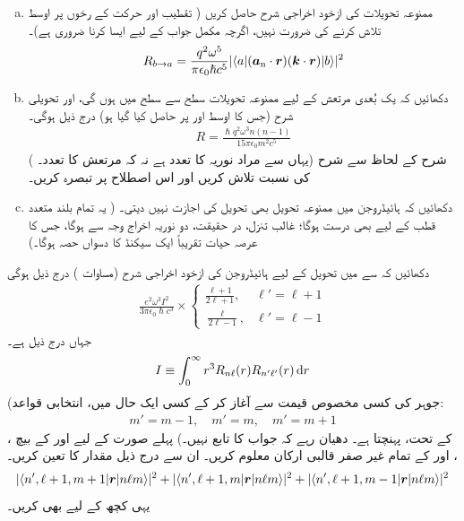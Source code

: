 \begin{enumerate}[a.]
\item
ممنوعہ تحویلات کی ازخود اخراجی شرح حاصل کریں ( تقطیب اور حرکت کے رخوں پر اوسط تلاش کرنے کی ضرورت نہیں، اگرچہ مکمل جواب کے لیے ایسا کرنا ضروری ہے)۔ 
\begin{align}
	R_{b\to a} = \frac{q^2\omega^5}{\pi\epsilon_0\hslash c^5}|\langle a|({{\boldsymbol{a}}_{\textup{n}}}\cdot{\ensuremath{{\boldsymbol{r}}}})({\boldsymbol{k}}\cdot {\ensuremath{{\boldsymbol{r}}}})|b \rangle|^2
\end{align}
\item
 دکھائیں کہ یک بُعدی مرتعش کے لیے ممنوعہ تحویلات سطح  سے سطح  میں ہوں گی، اور تحویلی شرح (جس کا اوسط  اور  پر حاصل کیا گیا ہو) درج ذیل ہوگی۔
\begin{align}
	R = \frac{\hslash q^2\omega^3n(n-1)}{15\pi\epsilon_0m^2c^5}
\end{align}
( یہاں  سے مراد نوریہ کا تعدد ہے نہ کہ مرتعش کا تعدد۔) شرح کے لحاظ سے  شرح کی نسبت تلاش کریں اور اس اصطلاح پر تبصرہ کریں۔
\item
 دکھائیں کہ ہائیڈروجن میں ممنوعہ تحویل بھی  تحویل کی اجازت نہیں دیتی۔ ( یہ تمام بلند متعدد قطب کے لیے بھی درست ہوگا؛ غالب تنزل، در حقیقت، دو نوریہ اخراج وجہ سے ہوگا، جس کا عرصہ حیات تقریباً ایک سیکنڈ کا دسواں حصہ ہوگا۔)
 \end{enumerate}
دکھائیں کہ  سے  میں تحویل کے لیے ہائیڈروجن کی ازخود اخراجی شرح (مساوات ) درج ذیل ہوگی
\begin{align}
	\frac{e^2\omega^3I^2}{3\pi\epsilon_0\hslash c^3}\times
	\begin{cases}
		\frac{\ell +1}{2\ell +1}, & \ell '= \ell +1 \\
		\frac{\ell }{2\ell -1}, & \ell '= \ell -1 
	\end{cases}
\end{align}
جہاں  درج ذیل ہے۔
\begin{align}
	I\equiv\int_{0}^{\infty} r^3R_{n\ell }(r)R_{n'\ell '}(r)\dif r
\end{align}
(جوہر  کی کسی مخصوص قیمت سے آغاز کر کے کسی ایک  حال میں، انتخابی قواعد:
\begin{align*}
m'=m-1,\quad m'=m,\quad m'=m+1
\end{align*}
 کے تحت، پہنچتا ہے۔ دھیان رہے کہ جواب  کا تابع نہیں۔)  پہلے  صورت کے لیے  اور  کے بیچ ، ، اور  کے تمام غیر صفر قالبی ارکان معلوم کریں۔ ان سے درج ذیل مقدار کا تعین کریں۔
\begin{align*}
	|\langle n', \ell +1,m+1|{{\boldsymbol{r}}}|n\ell m \rangle|^2 + |\langle n', \ell +1, m|{{\boldsymbol{r}}}|n\ell m \rangle|^2+|\langle n', \ell +1, m-1|{{\boldsymbol{r}}}|n\ell m\rangle|^2
\end{align*}
یہی کچھ  کے لیے بھی کریں۔

